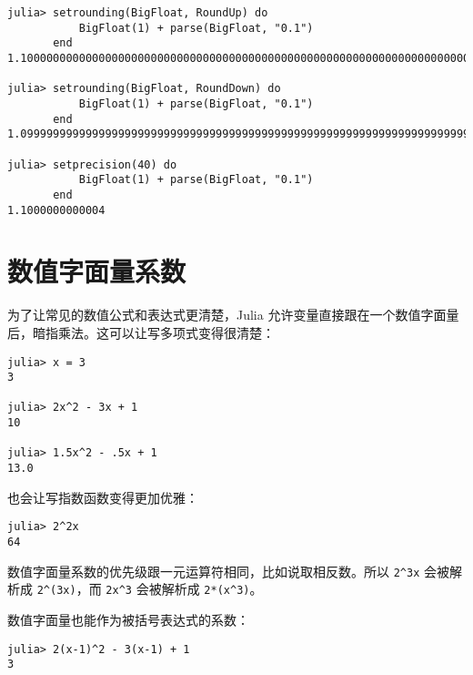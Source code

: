 \begin{verbatim}
julia> setrounding(BigFloat, RoundUp) do
           BigFloat(1) + parse(BigFloat, "0.1")
       end
1.100000000000000000000000000000000000000000000000000000000000000000000000000003

julia> setrounding(BigFloat, RoundDown) do
           BigFloat(1) + parse(BigFloat, "0.1")
       end
1.099999999999999999999999999999999999999999999999999999999999999999999999999986

julia> setprecision(40) do
           BigFloat(1) + parse(BigFloat, "0.1")
       end
1.1000000000004
\end{verbatim}



\hypertarget{14058350023597195643}{}


\section{数值字面量系数}



为了让常见的数值公式和表达式更清楚，Julia 允许变量直接跟在一个数值字面量后，暗指乘法。这可以让写多项式变得很清楚：




\begin{verbatim}
julia> x = 3
3

julia> 2x^2 - 3x + 1
10

julia> 1.5x^2 - .5x + 1
13.0
\end{verbatim}



也会让写指数函数变得更加优雅：




\begin{verbatim}
julia> 2^2x
64
\end{verbatim}



数值字面量系数的优先级跟一元运算符相同，比如说取相反数。所以 \texttt{2{\textasciicircum}3x} 会被解析成 \texttt{2{\textasciicircum}(3x)}，而 \texttt{2x{\textasciicircum}3} 会被解析成 \texttt{2*(x{\textasciicircum}3)}。



数值字面量也能作为被括号表达式的系数：




\begin{verbatim}
julia> 2(x-1)^2 - 3(x-1) + 1
3
\end{verbatim}



